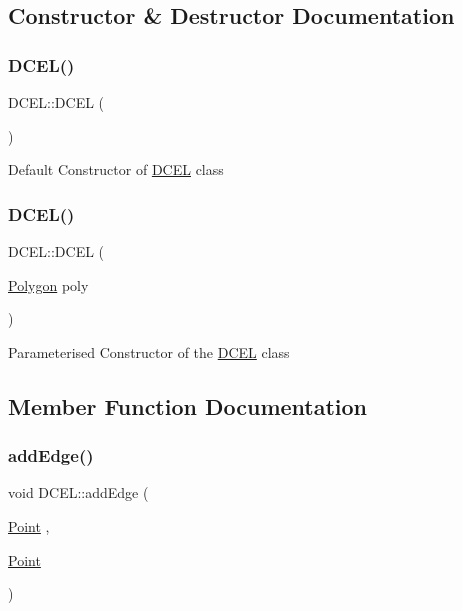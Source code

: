 \subsection{Constructor \& Destructor Documentation}
\mbox{\label{classDCEL_a5f12fccd0a8f0cd3450a21e9a2fafbd8}} 
\subsubsection{\texorpdfstring{D\+C\+E\+L()}{DCEL()}\hspace{0.1cm}{\footnotesize\ttfamily [1/2]}}
{\footnotesize\ttfamily D\+C\+E\+L\+::\+D\+C\+EL (\begin{DoxyParamCaption}{ }\end{DoxyParamCaption})}

Default Constructor of \hyperlink{classDCEL}{D\+C\+EL} class \mbox{\label{classDCEL_a8249e57b170cc6df5109231a3f189a15}} 
\subsubsection{\texorpdfstring{D\+C\+E\+L()}{DCEL()}\hspace{0.1cm}{\footnotesize\ttfamily [2/2]}}
{\footnotesize\ttfamily D\+C\+E\+L\+::\+D\+C\+EL (\begin{DoxyParamCaption}\item[{\hyperlink{classPolygon}{Polygon}}]{poly }\end{DoxyParamCaption})}

Parameterised Constructor of the \hyperlink{classDCEL}{D\+C\+EL} class 

\subsection{Member Function Documentation}
\mbox{\label{classDCEL_a513abdc4ca1faacef9d051a48a47c6c6}} 
\subsubsection{\texorpdfstring{add\+Edge()}{addEdge()}\hspace{0.1cm}{\footnotesize\ttfamily [1/2]}}
{\footnotesize\ttfamily void D\+C\+E\+L\+::add\+Edge (\begin{DoxyParamCaption}\item[{\hyperlink{classPoint}{Point}}]{,  }\item[{\hyperlink{classPoint}{Point}}]{ }\end{DoxyParamCaption})}

